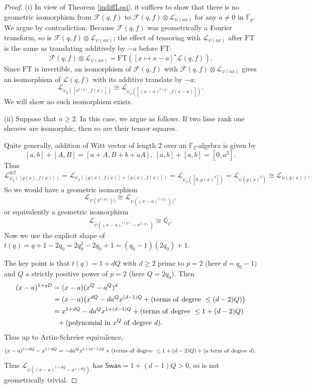 \documentclass[11pt]{amsart}
\theoremstyle{plain}
\theoremstyle{definition}
\numberwithin{thm}{section}
\numberwithin{equation}{thm}
\newcommand{\Swan}{\mathsf {Swan}}
\newcommand{\sF}{{\mathcal F}}
\newcommand{\sL}{{\mathcal L}}
\newcommand{\F}{{\mathbb F}}
\newcommand{\Q}{{\mathbb Q}}
\newcommand{\0}{\emptyset}
\newcommand{\FT}{\mathrm{FT}}
\begin{document}
\begin{proof}
(i) In view of Theorem \ref{indiffLpsi}, it suffices to show that there is no geometric isomorphism from $\sF(q,f)$ to $\sF(q,f)\otimes \sL_{\psi(ax)}$ for any $a \neq 0$ in $\overline{\F_p}$. We argue by contradiction.
 Because $\sF(q,f)$ was geometrically a Fourier transform, so is $\sF(q,f)\otimes \sL_{\psi(ax)}$; the effect of tensoring 
 with  $\sL_{\psi(ax)}$ after $\FT$ is the same as translating additively by $-a$ before $\FT$:
$$\sF(q,f)\otimes \sL_{\psi(ax)} =\FT([x \mapsto x-a]^\star \sL(q,f)).$$
 Since $\FT$ is invertible, an isomorphism of  $\sF(q,f)$ with $\sF(q,f)\otimes \sL_{\psi(ax)}$ gives an isomorphism of $\sL(q,f)$ with its additive translate by $-a$:
 $$\sL_{\psi_2([x^{t(q)},f(x)])} \cong \sL_{\psi_2([(x-a)^{t(q)},f(x-a)])}.$$
 We will show no such isomorphism exists. 
 
 \smallskip
(ii)  Suppose that $n \ge 2$. In this case, we argue as follows. If two
 lisse rank one sheaves are isomorphic, then so are their tensor squares.
 
 Quite generally, addition of Witt vector of length $2$ over an $\F_2$-algebra is given by
 $$[a,b]+[A,B]=[a+A, B+b +aA], \ [a,b]+[a,b]=[0,a^2].$$
 Thus
$$\sL_{\psi_2([g(x),f(x)])}^{\otimes 2} =\sL_{\psi_2([g(x),f(x)]+[g(x),f(x)])}=\sL_{\psi_2([0,g(x)^2])}=\sL_{\psi(g(x)^2)} \cong \sL_{\psi(g(x))}.$$
 So we would have a geometric isomorphism
 $$ \sL_{\psi(x^{t(q)}))} \cong  \sL_{\psi((x-a)^{t(q)}))}, $$
 or equivalently a geometric isomorphism
 $$ \sL_{\psi((x-a)^{t(q)}-x^{t(q)})} \cong \overline{\Q_\ell}.$$
 Now we use the explicit shape of $t(q)=q+1-2q_0 =2q_0^2 -2q_0+1=(q_0-1)(2q_0)+1$.

The key point is that $t(q)=1+dQ$ with $d \ge  2$ prime to $p=2$ (here $d=q_0-1)$ and $Q$ a strictly positive power of  $p=2$ (here $Q=2q_0$). Then
 $$\begin{aligned}(x-a)^{1+qD} & =(x-a)(x^Q-a^Q)^d\\
    & =(x-a)\bigl(x^{dQ} -da^Qx^{(d-1)Q} +({\rm terms \ of \ degree \ }\le (d-2)Q)\bigr)\\
    & =x^{1+dQ} -da^Qx^{1+(d-1)Q} +({\rm terms \ of \ degree \ }\le 1+(d-2)Q)\\
    &\ \  + ({\rm polynomial \  in \ }x^Q{\rm \ of\ degree\ }d).
    \end{aligned}$$
 Thus up to Artin-Schreier equivalence, 
 $$(x-a)^{1+dQ} -x^{1+dQ} = -da^Qx^{1+(d-1)Q} +({\rm terms\ of \ degree \ } \le 1+(d-2)Q) +({\rm a\ term\ of \ degree\  }d).$$
 Thus $\sL_{\psi((x-a)^{1+dQ} -x^{1+dQ} )}$ has $\Swan=1+(d-1)Q >0$, so is not geometrically trivial.
 

\end{proof}
\end{document}
